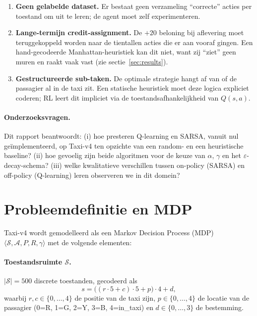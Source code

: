 \documentclass[11pt,a4paper]{article}
\begin{document}
\begin{enumerate}
  \item \textbf{Geen gelabelde dataset.} Er bestaat geen verzameling
        ``correcte'' acties per toestand om uit te leren; de agent moet
        zelf experimenteren.
  \item \textbf{Lange-termijn credit-assignment.} De $+20$ beloning bij
        aflevering moet teruggekoppeld worden naar de tientallen acties
        die er aan vooraf gingen. Een hand-gecodeerde Manhattan-heuristiek
        kan dit niet, want zij ``ziet'' geen muren en raakt vaak vast
        (zie sectie~\ref{sec:results}).
  \item \textbf{Gestructureerde sub-taken.} De optimale strategie hangt
        af van of de passagier al in de taxi zit. Een statische heuristiek
        moet deze logica expliciet coderen; RL leert dit impliciet via
        de toestandsafhankelijkheid van $Q(s,a)$.
\end{enumerate}

\paragraph{Onderzoeksvragen.} Dit rapport beantwoordt:
(i) hoe presteren Q-learning en SARSA, vanuit nul ge\"implementeerd, op
Taxi-v4 ten opzichte van een random- en een heuristische baseline?
(ii) hoe gevoelig zijn beide algoritmen voor de keuze van $\alpha$,
$\gamma$ en het $\varepsilon$-decay-schema?
(iii) welke kwalitatieve verschillen tussen on-policy (SARSA) en
off-policy (Q-learning) leren observeren we in dit domein?

\section{Probleemdefinitie en MDP}
\label{sec:mdp}

Taxi-v4 wordt gemodelleerd als een Markov Decision Process (MDP)
$\langle \mathcal{S}, \mathcal{A}, P, R, \gamma \rangle$ met de
volgende elementen:

\paragraph{Toestandsruimte $\mathcal{S}$.}
$|\mathcal{S}| = 500$ discrete toestanden, gecodeerd als
\begin{equation}
  s = \bigl((r \cdot 5 + c) \cdot 5 + p\bigr) \cdot 4 + d,
\end{equation}
waarbij $r, c \in \{0,\dots,4\}$ de positie van de taxi zijn,
$p \in \{0,\dots,4\}$ de locatie van de passagier (0=R, 1=G, 2=Y,
3=B, 4=in\_taxi) en $d \in \{0,\dots,3\}$ de bestemming.
\end{document}
